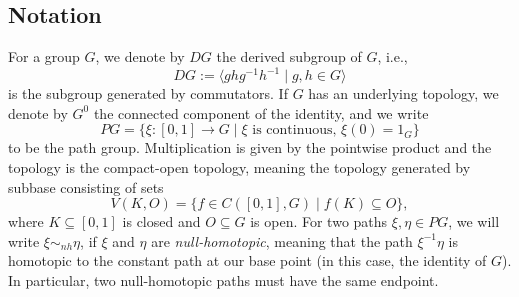 \documentclass{amsart}
\begin{document}
\subsection{Notation}
For a group $G$, we denote by $DG$ the derived subgroup of $G$, i.e.,
\begin{equation}
DG := \langle ghg^{-1}h^{-1} \mid g,h \in G \rangle
\end{equation}
is the subgroup generated by commutators.
If $G$ has an underlying topology, we denote by $G^0$ the connected component of the identity, and we write
\begin{equation}
PG= \{\xi: [0,1] \to G \mid \xi \text{ is continuous, } \xi(0) = 1_G \}
\end{equation}
to be the path group. Multiplication is given by the pointwise product and the topology is the compact-open topology, meaning the topology generated by subbase consisting of sets
\begin{equation}
V(K,O) = \{ f \in C([0,1],G) \mid f(K) \subseteq O\},
\end{equation}
where $K \subseteq [0,1]$ is closed and $O \subseteq G$ is open.
For two paths $\xi,\eta \in PG$, we will write $\xi \sim_{nh} \eta$, if $\xi$ and $\eta$ are \emph{null-homotopic}, meaning that the path $\xi^{-1}\eta$ is homotopic to the constant path at our base point (in this case, the identity of $G$). In particular, two null-homotopic paths must have the same endpoint.
\end{document}
